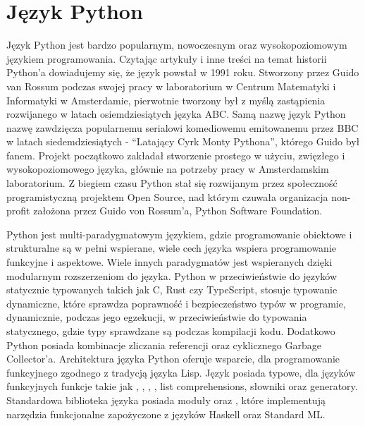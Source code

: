 


\section{Język Python}
Język Python \cite{IntroducingPython} \cite{AdvancedPythonDevelopment} \cite{ExpertPythonProgramming} jest bardzo popularnym, nowoczesnym oraz wysokopoziomowym językiem programowania. Czytając artykuły i inne treści na temat historii Python'a \cite{HistoriaPythona} \cite{WikipediaPythonProgrammingLanauge} dowiadujemy się, że język powstał w 1991 roku. Stworzony przez Guido van Rossum podczas swojej pracy w laboratorium w Centrum Matematyki i Informatyki w Amsterdamie, pierwotnie tworzony był z myślą zastąpienia rozwijanego w latach osiemdziesiątych języka ABC. Samą nazwę język Python nazwę zawdzięcza popularnemu serialowi komediowemu emitowanemu przez BBC w latach siedemdziesiątych - ``Latający Cyrk Monty Pythona'', którego Guido był fanem.
Projekt początkowo zakładał stworzenie prostego w użyciu, zwięzłego i wysokopoziomowego języka, głównie na potrzeby pracy w Amsterdamskim laboratorium. Z biegiem czasu Python stał się rozwijanym przez społeczność programistyczną projektem Open Source, nad którym czuwała organizacja non-profit założona przez Guido von Rossum'a, Python Software Foundation.

Python jest multi-paradygmatowym językiem, gdzie programowanie obiektowe i strukturalne są w pełni wspierane, wiele cech języka wspiera programowanie funkcyjne i aspektowe. Wiele innych paradygmatów jest wspieranych dzięki modularnym rozszerzeniom do języka.
Python w przeciwieństwie do języków statycznie typowanych takich jak C, Rust czy TypeScript, stosuje typowanie dynamiczne, które sprawdza poprawność i bezpieczeństwo typów w programie, dynamicznie, podczas jego egzekucji, w przeciwieństwie do typowania statycznego, gdzie typy sprawdzane są podczas kompilacji kodu. Dodatkowo Python posiada kombinacje zliczania referencji oraz cyklicznego Garbage Collector'a.
Architektura języka Python oferuje wsparcie, dla programowanie funkcyjnego zgodnego z tradycją języka Lisp. Język posiada typowe, dla języków funkcyjnych funkcje takie jak , , , , list comprehensions, słowniki oraz generatory. Standardowa biblioteka języka posiada moduły  oraz , które implementują narzędzia funkcjonalne zapożyczone z języków Haskell oraz Standard ML.

